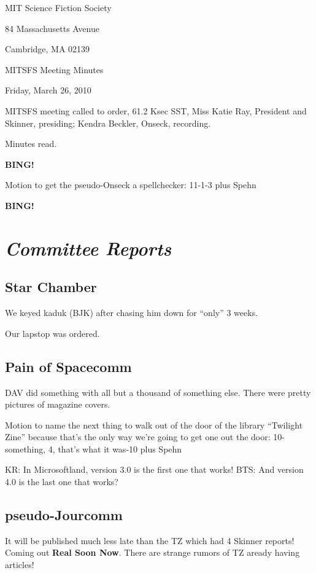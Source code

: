 \documentclass[10pt]{article}
\newcommand{\bing}{{\bf BING!} }
\newcommand{\goto}[1]{\bing \vskip 12pt \section*{{\em{#1}}}}
\newcommand{\ps}{ plus Spehn\xspace}
\newcommand{\skinner}{Miss Katie Ray, President and Skinner}
\newcommand{\onseck}{Kendra Beckler, Onseck}
\newcommand{\meetingdate}{Friday, March 26, 2010}
\begin{document}
\begin{center}

MIT Science Fiction Society

84 Massachusetts Avenue

Cambridge, MA 02139

\vspace{12pt}

MITSFS Meeting Minutes

\meetingdate

\end{center}

\vspace{18pt}

\setlength{\parskip}{6pt}

\noindent
MITSFS meeting called to order, 61.2 Ksec SST,
\skinner, presiding; \onseck, recording.

Minutes read.

\bing

Motion to get the pseudo-Onseck a spellchecker: 11-1-3 \ps

\goto{Committee Reports}

\subsection*{Star Chamber}
We keyed kaduk (BJK) after chasing him down for ``only'' 3 weeks.

Our lapstop was ordered.

\subsection*{Pain of Spacecomm}
DAV did something with all but a thousand of something else.  There were pretty pictures of magazine covers.

Motion to name the next thing to walk out of the door of the library ``Twilight Zine'' because that's the only way we're going to get one out the door: 10-something, 4, that's what it was-10 \ps

KR: In Microsoftland, version 3.0 is the first one that works!
BTS: And version 4.0 is the last one that works?

\subsection*{pseudo-Jourcomm}
It will be published much less late than the TZ which had 4 Skinner reports!  Coming out \textbf{Real Soon Now}.  There are strange rumors of TZ aready having articles!
\end{document}
